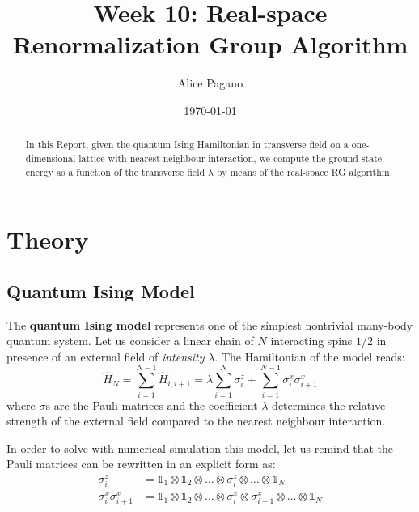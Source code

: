 \documentclass[rmp,10pt,onecolumn,fleqn,notitlepage]{revtex4-1}
\begin{document}
\title{Week 10: Real-space Renormalization Group Algorithm}
\author{Alice Pagano}
\date{\today}

\begin{abstract}
In this Report, given the quantum Ising Hamiltonian in transverse field on a one-dimensional lattice with nearest neighbour interaction, we compute the ground state energy as a function of the transverse field \( \lambda  \) by means of the real-space RG algorithm.
\end{abstract}

\maketitle


\section{Theory}

\subsection{Quantum Ising Model}

The \textbf{quantum Ising model} represents one of the simplest nontrivial many-body quantum system. Let us consider a linear chain of $N$ interacting spins $1/2$ in presence of an external field of \emph{intensity} $\lambda$. The Hamiltonian of the model reads:
\begin{equation}
  \hat{H}_N  = \sum_{i=1}^{N-1} \hat{H}_{i,i+1} = \lambda \sum_{i=1}^{N} \sigma _i^{z} + \sum_{i=1}^{N-1} \sigma _{i}^{x} \sigma _{i+1}^{x}
  \label{eq:hamiltonian}
\end{equation}
where \( \sigma  \)s are the Pauli matrices and the coefficient $\lambda$ determines the relative strength of the external field compared to the nearest neighbour interaction.

In order to solve with numerical simulation this model, let us remind that the Pauli matrices can be rewritten in an explicit form as:
\begin{subequations}
\begin{align}
 \sigma _i^z  &= \mathbb{1}_1 \otimes \mathbb{1}_2 \otimes \dots \otimes \sigma _i^z \otimes \dots \otimes \mathbb{1}_N \label{eq:rel_sigma_z}\\
\sigma _{i}^x \sigma _{i+1}^x &= \mathbb{1}_1 \otimes \mathbb{1}_2 \otimes \dots \otimes \sigma _i^x \otimes \sigma _{i+1}^x \otimes \dots \otimes \mathbb{1}_N\label{eq:rel_sigma_x}
\end{align}
\end{subequations}
\end{document}
